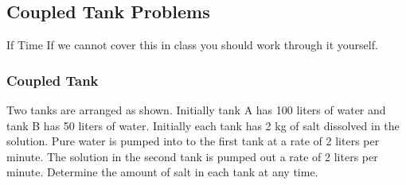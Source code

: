 \subsection{Coupled Tank Problems}

\begin{frame}{If Time}
  \vfill
  If we cannot cover this in class you should work through it
  yourself.
  \vfill
\end{frame}

\begin{frame}
  \frametitle{Coupled Tank}


  Two tanks are arranged as shown. Initially tank A has 100 liters of
  water and tank B has 50 liters of water. Initially each tank has 2
  kg of salt dissolved in the solution. Pure water is pumped into to
  the first tank at a rate of 2 liters per minute. The solution in the
  second tank is pumped out a rate of 2 liters per minute. Determine
  the amount of salt in each tank at any time.
  
\end{frame}



